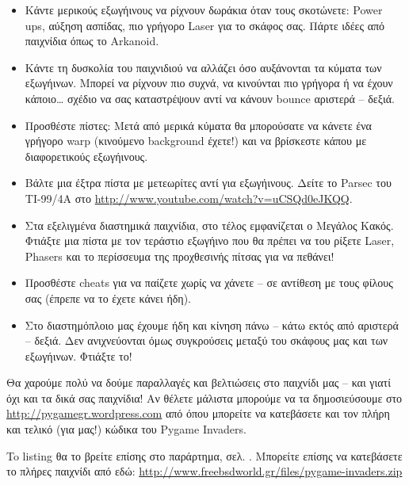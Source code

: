 \begin{itemize}
  \item Κάντε μερικούς εξωγήινους να ρίχνουν δωράκια όταν τους σκοτώνετε:
      Power ups, αύξηση ασπίδας, πιο γρήγορο Laser για το σκάφος σας.
      Πάρτε ιδέες από παιχνίδια όπως το Arkanoid.

  \item Κάντε τη δυσκολία του παιχνιδιού να αλλάζει όσο αυξάνονται τα κύματα
      των εξωγήινων. Μπορεί να ρίχνουν πιο συχνά, να κινούνται πιο γρήγορα
      ή να έχουν κάποιο\ldots{} σχέδιο να σας καταστρέψουν αντί να κάνουν bounce
      αριστερά -- δεξιά.

  \item Προσθέστε πίστες: Μετά από μερικά κύματα θα μπορούσατε να κάνετε ένα
      γρήγορο warp (κινούμενο background έχετε!) και να βρίσκεστε κάπου
      με διαφορετικούς εξωγήινους.

  \item Βάλτε μια έξτρα πίστα με μετεωρίτες αντί για εξωγήινους. Δείτε το
      Parsec του TI-99/4A στο \url{http://www.youtube.com/watch?v=uCSQd0eJKQQ}.

  \item Στα εξελιγμένα διαστημικά παιχνίδια, στο τέλος εμφανίζεται ο Μεγάλος
      Κακός\texttrademark. Φτιάξτε μια πίστα με τον τεράστιο εξωγήινο που θα πρέπει
      να του ρίξετε Laser, Phasers και το περίσσευμα της προχθεσινής πίτσας
      για να πεθάνει!

  \item Προσθέστε cheats για να παίζετε χωρίς να χάνετε -- σε αντίθεση με τους
      φίλους σας (έπρεπε να το έχετε κάνει ήδη).

  \item Στο διαστημόπλοιο μας έχουμε ήδη και κίνηση πάνω -- κάτω εκτός από
      αριστερά -- δεξιά. Δεν ανιχνεύονται όμως συγκρούσεις μεταξύ του
      σκάφους μας και των εξωγήινων. Φτιάξτε το!
\end{itemize}

Θα χαρούμε πολύ να δούμε παραλλαγές και βελτιώσεις στο παιχνίδι μας -- και
   γιατί όχι και τα δικά σας παιχνίδια! Αν θέλετε μάλιστα μπορούμε να τα
   δημοσιεύσουμε στο \url{http://pygamegr.wordpress.com}
   από όπου μπορείτε να κατεβάσετε και τον πλήρη και τελικό (για μας!)
   κώδικα του Pygame Invaders.

To listing θα το βρείτε επίσης στο παράρτημα, σελ. \pageref{listing:pygame-invaders}. Μπορείτε επίσης να κατεβάσετε το πλήρες παιχνίδι από εδώ: \url{http://www.freebsdworld.gr/files/pygame-invaders.zip}
